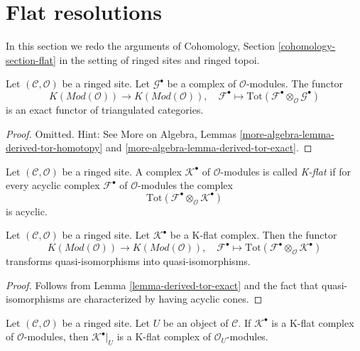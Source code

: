 \section{Flat resolutions}
\label{section-flat}

\noindent
In this section we redo the arguments of
Cohomology, Section \ref{cohomology-section-flat}
in the setting of ringed sites and ringed topoi.

\begin{lemma}
\label{lemma-derived-tor-exact}
Let $(\mathcal{C}, \mathcal{O})$ be a ringed site.
Let $\mathcal{G}^\bullet$ be a complex of $\mathcal{O}$-modules.
The functor
$$
K(\textit{Mod}(\mathcal{O}))
\longrightarrow
K(\textit{Mod}(\mathcal{O})),
\quad
\mathcal{F}^\bullet \longmapsto
\text{Tot}(\mathcal{F}^\bullet \otimes_\mathcal{O} \mathcal{G}^\bullet)
$$
is an exact functor of triangulated categories.
\end{lemma}

\begin{proof}
Omitted. Hint: See
More on Algebra, Lemmas \ref{more-algebra-lemma-derived-tor-homotopy} and
\ref{more-algebra-lemma-derived-tor-exact}.
\end{proof}

\begin{definition}
\label{definition-K-flat}
Let $(\mathcal{C}, \mathcal{O})$ be a ringed site.
A complex $\mathcal{K}^\bullet$ of $\mathcal{O}$-modules is
called {\it K-flat} if for every acyclic complex $\mathcal{F}^\bullet$
of $\mathcal{O}$-modules the complex
$$
\text{Tot}(\mathcal{F}^\bullet \otimes_\mathcal{O} \mathcal{K}^\bullet)
$$
is acyclic.
\end{definition}

\begin{lemma}
\label{lemma-K-flat-quasi-isomorphism}
Let $(\mathcal{C}, \mathcal{O})$ be a ringed site.
Let $\mathcal{K}^\bullet$ be a K-flat complex.
Then the functor
$$
K(\textit{Mod}(\mathcal{O}))
\longrightarrow
K(\textit{Mod}(\mathcal{O})), \quad
\mathcal{F}^\bullet
\longmapsto
\text{Tot}(\mathcal{F}^\bullet \otimes_\mathcal{O} \mathcal{K}^\bullet)
$$
transforms quasi-isomorphisms into quasi-isomorphisms.
\end{lemma}

\begin{proof}
Follows from
Lemma \ref{lemma-derived-tor-exact}
and the fact that quasi-isomorphisms are characterized by having
acyclic cones.
\end{proof}

\begin{lemma}
\label{lemma-restriction-K-flat}
Let $(\mathcal{C}, \mathcal{O})$ be a ringed site.
Let $U$ be an object of $\mathcal{C}$.
If $\mathcal{K}^\bullet$ is a K-flat complex of $\mathcal{O}$-modules, then
$\mathcal{K}^\bullet|_U$ is a K-flat complex of $\mathcal{O}_U$-modules.
\end{lemma}

